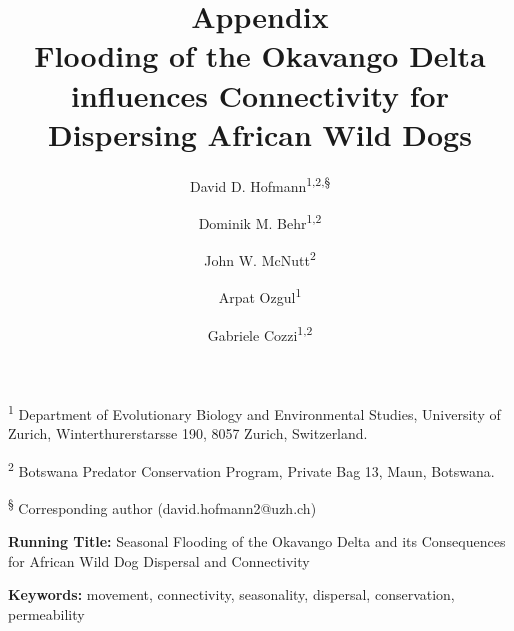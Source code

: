 \documentclass[abstract=on,10pt,a4paper,bibliography=totocnumbered]{article}
\title{\textbf{Appendix}\\ Flooding of the Okavango Delta influences
Connectivity for Dispersing African Wild Dogs}
\author{
  David D. Hofmann\textsuperscript{1,2,\S} \orcid{0000-0003-3477-4365} \and
  Dominik M. Behr\textsuperscript{1,2} \orcid{0000-0001-7378-8538} \and
  John W. McNutt\textsuperscript{2} \and
  Arpat Ozgul\textsuperscript{1} \orcid{0000-0001-7477-2642} \and
  Gabriele Cozzi\textsuperscript{1,2} \orcid{0000-0002-1744-1940}
}
\newcommand{\beginappendix}{%
  \setcounter{table}{0}
  \renewcommand{\thetable}{S\arabic{table}}%
  \setcounter{figure}{0}
  \renewcommand{\thefigure}{S\arabic{figure}}%
  \setcounter{equation}{0}
  \renewcommand{\theequation}{Equation S\arabic{equation}}%
  \setcounter{section}{0}
  \renewcommand{\thesection}{A.\arabic{section}}%
}
\renewcommand{\theequation}{Equation \arabic{equation}}%
\begin{document}



\maketitle

\begin{flushleft}

\vspace{0.5cm}

\textsuperscript{1} Department of Evolutionary Biology and Environmental
Studies, University of Zurich, Winterthurerstarsse 190, 8057 Zurich,
Switzerland.

\textsuperscript{2} Botswana Predator Conservation Program, Private Bag 13,
Maun, Botswana.

\textsuperscript{\S} Corresponding author (david.hofmann2@uzh.ch)

\vspace{4cm}

\textbf{Running Title:} Seasonal Flooding of the Okavango Delta and its
Consequences for African Wild Dog Dispersal and Connectivity

\vspace{0.5cm}

\textbf{Keywords:} movement, connectivity, seasonality, dispersal, conservation,
permeability

\end{flushleft}

\newpage



\appendix
\beginappendix

\newpage
\end{document}
